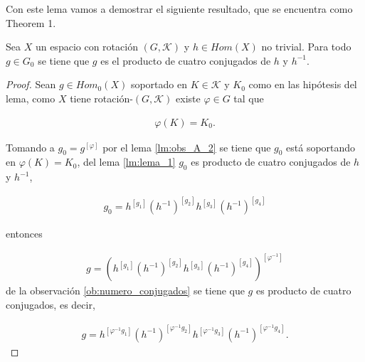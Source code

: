\documentclass{subfiles}
\begin{document}
Con este lema vamos a demostrar el siguiente resultado, que se encuentra como \cite{ander} Theorem 1.

\begin{te}
Sea $X$ un espacio con rotación $(G,\mathcal{K})$ y $h \in Hom(X)$ no trivial. Para todo $g \in G_0$ se tiene que $g$ es el producto de cuatro conjugados de $h$ y $h^{-1}$.
\end{te}



\begin{proof}
Sean $g \in Hom_0(X)$ soportado en $K \in \mathcal{K}$ y $K_0$ como en las hipótesis del lema, como $X$ tiene rotación-$(G,\mathcal{K})$  existe $\varphi \in G$ tal que 

\begin{align*}
    \varphi(K) = K_0.
\end{align*}

Tomando a $g_0= g^{[\varphi]}$ por el lema \ref{lm:obs_A_2} se tiene que $g_0$ está soportando en $\varphi(K)=K_0$, del lema  \ref{lm:lema_1} $g_0$ es producto de cuatro conjugados de $h$ y $h^{-1}$,

\begin{align*}
g_0= h^{[g_1]}(h^{-1})^{[g_2]}h^{[g_3]}(h^{-1})^{[g_4]}
\end{align*}

 entonces
 
\begin{align*}
 g= \left( h^{[g_1]}(h^{-1})^{[g_2]}h^{[g_3]}(h^{-1})^{[g_4]} \right)^{[\varphi^{-1}]}
\end{align*}
 de la observación \ref{ob:numero_conjugados} se tiene que $g$ es producto de cuatro conjugados, es decir, 
 
 \begin{align*}
 g= h^{[\varphi^{-1}g_1]}(h^{-1})^{[\varphi^{-1}g_2]}h^{[\varphi^{-1}g_3]}(h^{-1})^{[\varphi^{-1}g_4]} .
\end{align*}
\end{proof}
\end{document}
